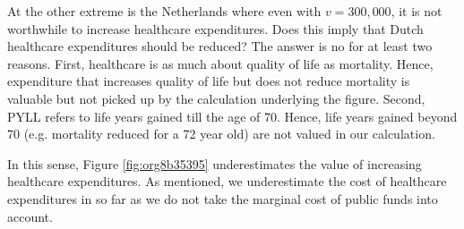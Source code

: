 \documentclass[12pt,english,a4paper]{article}
\begin{document}
At the other extreme is the Netherlands where even with \(v = 300,000\), it is not worthwhile to increase healthcare expenditures. Does this imply that Dutch healthcare expenditures should be reduced? The answer is no for at least two reasons. First, healthcare is as much about quality of life as mortality. Hence, expenditure that increases quality of life but does not reduce mortality is valuable but not picked up by the calculation underlying the figure. Second, PYLL refers to life years gained till the age of 70. Hence, life years gained beyond 70 (e.g. mortality reduced for a 72 year old) are not valued in our calculation.

In this sense, Figure \ref{fig:org8b35395} underestimates the value of increasing healthcare expenditures. As mentioned, we underestimate the cost of healthcare expenditures in so far as we do not take the marginal cost of public funds into account.
\end{document}
